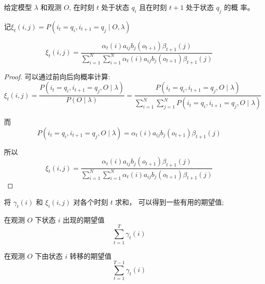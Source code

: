 \begin{theorem}
    \label{Thm:ComputeXi}
    给定模型 $ \lambda $ 和观测 $ O $, 在时刻 $ t $ 处于状态 $ q_{i} $ 且在时刻 $ t+1 $ 处于状态 $ q_{j} $ 的概 率。 
    
    记$ \xi_{t}(i, j)=P\left(i_{t}=q_{i}, i_{t+1}=q_{j} \mid O, \lambda\right) $

\begin{equation} \xi_{t}(i, j)=\frac{\alpha_{t}(i) a_{i j} b_{j}\left(o_{t+1}\right) \beta_{t+1}(j)}{\sum_{i=1}^{N} \sum_{i=1}^{N} \alpha_{t}(i) a_{i j} b_{j}\left(o_{t+1}\right) \beta_{t+1}(j)} \end{equation}
\end{theorem}



\begin{proof}
    可以通过前向后向概率计算:
\begin{equation}
\xi_{t}(i, j)=\frac{P\left(i_{t}=q_{i}, i_{t+1}=q_{j}, O \mid \lambda\right)}{P(O \mid \lambda)}=\frac{P\left(i_{t}=q_{i}, i_{t+1}=q_{j}, O \mid \lambda\right)}{\sum_{i=1}^{N} \sum_{j=1}^{N} P\left(i_{t}=q_{i}, i_{t+1}=q_{j}, O \mid \lambda\right)}
\end{equation}

而
\begin{equation}
P\left(i_{t}=q_{i}, i_{t+1}=q_{j}, O \mid \lambda\right)=\alpha_{t}(i) a_{i j} b_{j}\left(o_{t+1}\right) \beta_{t+1}(j)
\end{equation}


所以
\begin{equation} \xi_{t}(i, j)=\frac{\alpha_{t}(i) a_{i j} b_{j}\left(o_{t+1}\right) \beta_{t+1}(j)}{\sum_{i=1}^{N} \sum_{i=1}^{N} \alpha_{t}(i) a_{i j} b_{j}\left(o_{t+1}\right) \beta_{t+1}(j)} \end{equation}
\end{proof}

将 $ \gamma_{t}(i) $ 和 $ \xi_{i}(i, j) $ 对各个时刻 $ t $ 求和， 可以得到一些有用的期望值;

\begin{theorem}
   在观测 $ O $ 下状态 $ i $ 出现的期望值
\begin{equation}
\sum_{t=1}^{T} \gamma_{t}(i)
\end{equation} 
\end{theorem}

\begin{theorem}
    在观测 $ O $ 下由状态 $ i $ 转移的期望值
\begin{equation}
\sum_{t=1}^{T-1} \gamma_{t}(i)
\end{equation}
\end{theorem}

